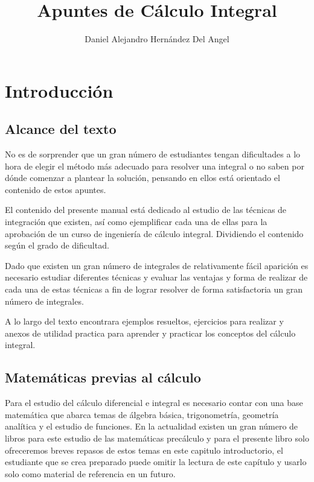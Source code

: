 \documentclass[11pt,letterpaper,oneside]{book}
\author{Daniel Alejandro Hernández Del Angel}
\title{Apuntes de Cálculo Integral}
\numberwithin{equation}{section}
\begin{document}
	
	\maketitle
	\tableofcontents
	
	\chapter{Introducción}
	\section{Alcance del texto}
	\par %
	No es de sorprender que un gran número de estudiantes tengan dificultades a lo hora de elegir el método más adecuado para resolver una integral o no saben por dónde comenzar a plantear la solución, pensando en ellos está orientado el contenido de estos apuntes.
	\par %
	El contenido del presente manual está dedicado al estudio de las técnicas de integración que existen, así como ejemplificar cada una de ellas para la aprobación de un curso de ingeniería de cálculo integral. Dividiendo el contenido según el grado de dificultad.
	\par %
	Dado que existen un gran número de integrales de relativamente fácil aparición es necesario estudiar diferentes técnicas y evaluar las ventajas y forma de realizar de cada una de estas técnicas a fin de lograr resolver de forma satisfactoria un gran número de integrales.
	\par
	A lo largo del texto encontrara ejemplos resueltos, ejercicios para realizar y anexos de utilidad practica para aprender y practicar los conceptos del cálculo integral.
	
	\section{Matemáticas previas al cálculo}
	\par
	Para el estudio del cálculo diferencial e integral es necesario contar con una base matemática que abarca temas de álgebra básica, trigonometría, geometría analítica y el estudio de funciones. En la actualidad existen un gran número de libros para este estudio de las matemáticas precálculo y para el presente libro solo ofreceremos breves repasos de estos temas en este capitulo introductorio, el estudiante que se crea preparado puede omitir la lectura de este capítulo y usarlo solo como material de referencia en un futuro.
	
\end{document}
